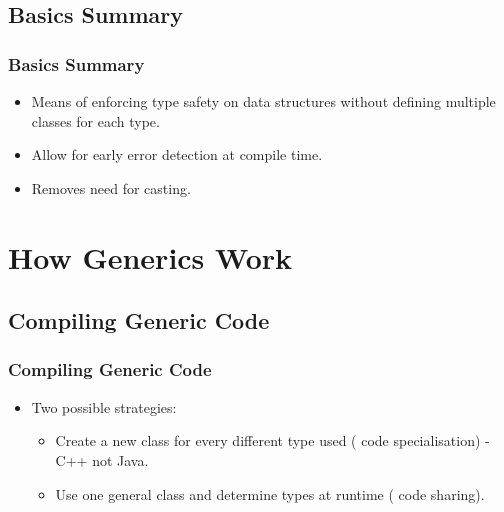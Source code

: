 \documentclass{beamer}
\begin{document}
\subsection{Basics Summary}
\begin{frame}
\frametitle{Basics Summary}
\begin{itemize}
\item Means of enforcing {\color{green} type safety} on data structures without defining multiple classes for each type.
\item Allow for early {\color{orange} error detection at compile time}.
\item Removes need for casting.
\end{itemize}
\end{frame}
\section{How Generics Work}
\subsection{Compiling Generic Code}
\begin{frame}
\frametitle{Compiling Generic Code}
\begin{itemize}
\item Two possible strategies:
\begin{itemize}
\item Create a new class for every different type used ({\color{red} code specialisation}) - {\color{orange} C++ not Java}.
\item Use one general class and determine types at runtime ({\color{green} code sharing}).
\end{itemize}
\end{itemize}
\end{frame}
\end{document}

